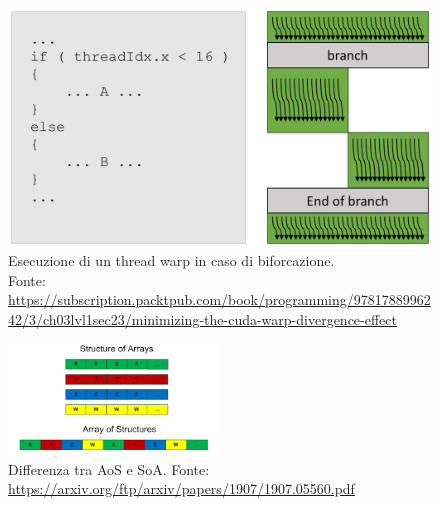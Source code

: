 \documentclass[12pt,a4paper,oneside]{book}
\begin{document}
	\begin{figure}[!ht]
		\centering
		\includegraphics[width=0.7\linewidth]{thread-warp}
		\caption{Esecuzione di un thread warp in caso di biforcazione.\\Fonte: \url{https://subscription.packtpub.com/book/programming/9781788996242/3/ch03lvl1sec23/minimizing-the-cuda-warp-divergence-effect}}
		\label{fig:thread-warp}
	\end{figure}

	\begin{figure}
		\centering
		\includegraphics[width=0.5\textwidth]{aos-vs-soa}
		\caption{Differenza tra AoS e SoA. Fonte: \url{https://arxiv.org/ftp/arxiv/papers/1907/1907.05560.pdf}}
		\label{fig:aos-vs-soa}
	\end{figure}
\end{document}

